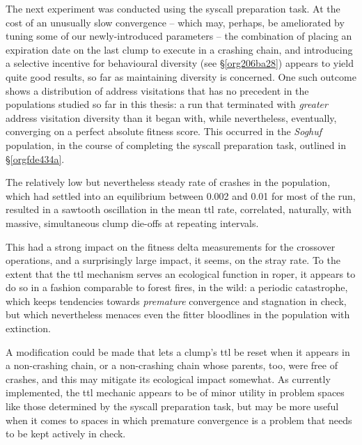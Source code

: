 \documentclass[12pt,glossary]{dalthesis}
\begin{document}
The next experiment was conducted using the syscall preparation task. 
At the cost of an unusually slow convergence -- which may, perhaps, be
ameliorated by tuning some of our newly-introduced parameters -- the combination
of placing an expiration date on the last clump to execute in a crashing chain,
and introducing a selective incentive for behavioural diversity (see \S \ref{org206ba28}) appears to yield
quite good results, so far as maintaining diversity is concerned. One such outcome
shows a distribution of address visitations that has no precedent in the populations
studied so far in this thesis: a run that terminated with \emph{greater} address visitation
diversity than it began with, while nevertheless, eventually, converging on a perfect
absolute fitness score. This occurred in the \emph{Soghuf} population, in the course of
completing the syscall preparation task, outlined in \S \ref{orgfde434a}.

The relatively low but nevertheless
steady rate of crashes in the population, which had settled into an equilibrium between
0.002 and 0.01 for most of the run, resulted in a sawtooth oscillation in the
mean \gls{ttl} rate, correlated, naturally, with massive, simultaneous clump die-offs at
repeating intervals. 

This had a strong impact on the fitness delta measurements for
the crossover operations, and a surprisingly large impact, it seems, on the stray
rate. To the extent that the \gls{ttl} mechanism serves an ecological function in
\gls{roper}, it appears to do so in a fashion comparable to forest fires, in the wild:
a periodic catastrophe, which keeps tendencies towards \emph{premature} convergence and
stagnation in check, but which nevertheless menaces even the fitter bloodlines in
the population with extinction. 

A modification could be made that lets a clump's \gls{ttl} be reset when
it appears in a non-crashing chain, or a non-crashing chain whose parents, too, were
free of crashes, and this may mitigate its ecological
impact somewhat. As currently implemented, the \gls{ttl} mechanic appears to be of
minor utility in problem spaces like those determined by the syscall preparation
task, but may be more useful when it comes to spaces in which premature
convergence is a problem that needs to be kept actively in check.
\end{document}
